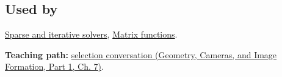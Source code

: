 \subsection{Used by}\label{appendix-221a483bec2d-used-by}

\hypertarget{appendix-221a483bec2d-used-by}{}

\hyperref[appendix-67c87a3d9e94]{Sparse and iterative solvers}, \hyperref[appendix-0f4bc2bf2b1f]{Matrix functions}.

\textbf{Teaching path:} \href{../03-Geometry-Cameras-and-Image-Formation-P01/main.pdf\#02-foundations-ii-ch038-close-the-journey-with-an-algorithm-selection-conversation}{selection conversation (Geometry, Cameras, and Image Formation, Part 1, Ch. 7)}.
